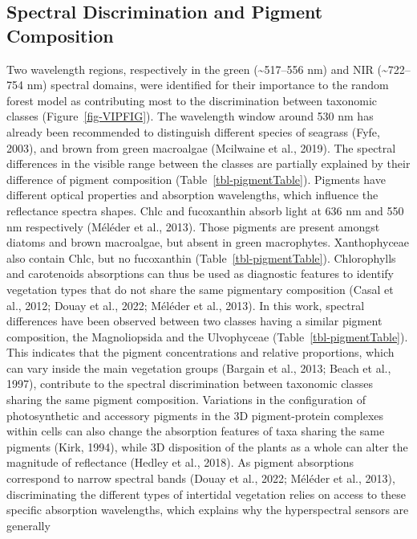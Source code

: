 \documentclass[
  letterpaper,
  11pt,
  english,
  singlespacing,
  headsepline]{MastersDoctoralThesis}
\begin{document}
\begin{spacing}{1.5}
\subsection{Spectral Discrimination and Pigment
Composition}\label{spectral-discrimination-and-pigment-composition}

Two wavelength regions, respectively in the green
(\textasciitilde517--556 nm) and NIR (\textasciitilde722--754 nm)
spectral domains, were identified for their importance to the random
forest model as contributing most to the discrimination between
taxonomic classes (Figure~\ref{fig-VIPFIG}). The wavelength window
around 530 nm has already been recommended to distinguish different
species of seagrass (Fyfe, 2003), and brown from green macroalgae
(Mcilwaine et al., 2019). The spectral differences in the visible range
between the classes are partially explained by their difference of
pigment composition (Table~\ref{tbl-pigmentTable}). Pigments have
different optical properties and absorption wavelengths, which influence
the reflectance spectra shapes. Chlc and fucoxanthin absorb light at 636
nm and 550 nm respectively (Méléder et al., 2013). Those pigments are
present amongst diatoms and brown macroalgae, but absent in green
macrophytes. Xanthophyceae also contain Chlc, but no fucoxanthin
(Table~\ref{tbl-pigmentTable}). Chlorophylls and carotenoids absorptions
can thus be used as diagnostic features to identify vegetation types
that do not share the same pigmentary composition (Casal et al., 2012;
Douay et al., 2022; Méléder et al., 2013). In this work, spectral
differences have been observed between two classes having a similar
pigment composition, the Magnoliopsida and the Ulvophyceae
(Table~\ref{tbl-pigmentTable}). This indicates that the pigment
concentrations and relative proportions, which can vary inside the main
vegetation groups (Bargain et al., 2013; Beach et al., 1997), contribute
to the spectral discrimination between taxonomic classes sharing the
same pigment composition. Variations in the configuration of
photosynthetic and accessory pigments in the 3D pigment-protein
complexes within cells can also change the absorption features of taxa
sharing the same pigments (Kirk, 1994), while 3D disposition of the
plants as a whole can alter the magnitude of reflectance (Hedley et al.,
2018). As pigment absorptions correspond to narrow spectral bands (Douay
et al., 2022; Méléder et al., 2013), discriminating the different types
of intertidal vegetation relies on access to these specific absorption
wavelengths, which explains why the hyperspectral sensors are generally

\end{spacing}
\end{document}
